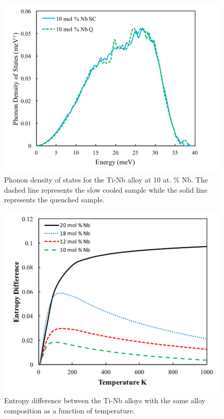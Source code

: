 \pagebreak
\begin{figure}[H]
	\centering
	\includegraphics[width=\textwidth]{Chapter-7/Figures/50dos10.png}
	\caption{Phonon density of states for the Ti-Nb alloy at 10 at. \% Nb. The dashed line represents the slow cooled sample while the solid line represents the quenched sample.}
	\label{Ch7-figure:50dos10}
\end{figure}

\pagebreak
\begin{figure}[H]
	\centering
	\includegraphics[width=\textwidth]{Chapter-7/Figures/ediff.png}
	\caption{Entropy difference between the Ti-Nb alloys with the same alloy composition as a function of temperature.}
	\label{Ch7-figure:ediff}
\end{figure}

